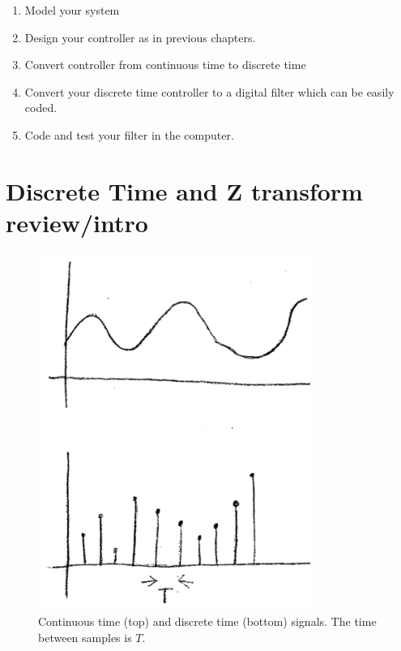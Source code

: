 \begin{enumerate}
  \item Model your system
  \item Design your controller as in previous chapters.
  \item Convert controller from continuous time to discrete time
  \item Convert your discrete time controller to a digital filter which can be easily coded.
  \item Code and test your filter in the computer.
\end{enumerate}

\section{Discrete Time and Z transform review/intro}

\begin{figure}[h]
\includegraphics[width=3.5in]{figs11/cont_disc_sigsa.png}	%
\caption{Continuous time (top) and discrete time (bottom) signals. The time between samples is $T$.}\label{FigContinuousDiscreteSignals}
\end{figure}



